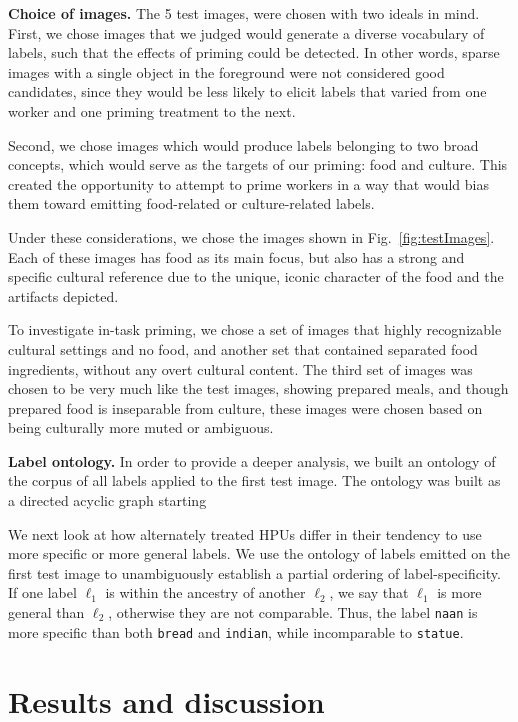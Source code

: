 \documentclass[letterpaper]{article}
\begin{document}
\textbf{Choice of images.}
The 5 test images, were chosen with two ideals in mind.  
First, we chose images that we judged would generate a diverse vocabulary of 
labels, such that the effects of priming could be detected.  In other words,
sparse images with a single object in the foreground were not considered good 
candidates, since they would be less likely to elicit labels that varied from 
one worker and one priming treatment to the next.

Second, we chose images which would produce labels belonging to two broad
concepts, which would serve as the targets of our priming: food and culture.  
This created the opportunity to attempt to prime workers in a way that would
bias them toward emitting food-related or culture-related labels.

Under these considerations, we chose the images shown in 
Fig.~\ref{fig:testImages}.  Each of these images has food as its main focus,
but also has a strong and specific cultural reference due to the unique, 
iconic character of the food and the artifacts depicted.

To investigate in-task priming, we chose a set of images that highly
recognizable cultural settings and no food, and another set that contained
separated food ingredients, without any overt cultural content.  The third
set of images was chosen to be very much like the test images, showing prepared
meals, and though prepared food is inseparable from culture, these images
were chosen based on being culturally more muted or ambiguous. 

\textbf{Label ontology.}
In order to provide a deeper analysis, we built an ontology
of the corpus of all labels applied to the first test image.  The ontology
was built as a directed acyclic graph starting 

We next look at how alternately treated HPUs differ in their tendency to use
more specific or more general labels. We use the ontology of labels emitted
on the first test image to unambiguously establish a partial ordering of 
label-specificity.  If one label $\ell_1$ is within the ancestry of another
$\ell_2$, we say that $\ell_1$ is more general than $\ell_2$, otherwise they
are not comparable.  Thus, the label \texttt{naan} is more 
specific than both \texttt{bread} and \texttt{indian}, while incomparable to
\texttt{statue}.

\section*{Results and discussion}
\end{document}
